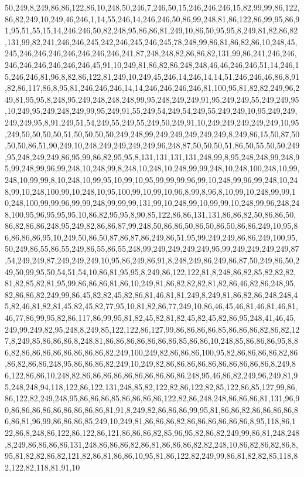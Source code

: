 50,249,8,249,86,86,122,86,10,248,50,246,7,246,50,15,246,246,246,15,82,99,99,86,122,86,82,249,10,249,46,246,1,14,55,246,14,246,246,50,86,99,248,81,86,122,86,99,95,86,91,95,51,55,15,14,246,246,50,82,248,95,86,86,81,249,10,86,50,95,95,8,249,81,82,86,82,131,99,82,241,246,246,245,242,246,245,246,245,78,248,99,86,81,86,82,86,10,248,45,245,246,246,246,246,246,246,246,241,87,248,248,82,86,86,82,131,99,86,241,246,246,246,246,246,246,246,246,45,91,10,249,81,86,82,86,248,248,46,46,246,246,51,14,246,15,246,246,81,96,8,82,86,122,81,249,10,249,45,246,14,246,14,14,51,246,246,46,86,8,91,82,86,117,86,8,95,81,246,246,246,14,14,246,246,246,246,81,100,95,81,82,82,249,96,249,81,95,95,8,248,95,249,248,248,248,99,95,248,249,249,91,95,249,249,55,249,249,95,10,249,95,249,248,249,99,95,249,91,55,249,54,249,54,249,55,249,249,10,95,249,249,249,249,95,8,91,249,51,54,249,55,249,55,249,50,249,91,10,249,249,249,249,249,10,95,249,50,50,50,50,51,50,50,50,50,249,248,99,249,249,249,249,249,8,249,86,15,50,87,50,50,50,86,51,90,249,10,248,249,249,249,249,96,248,87,50,50,50,51,86,50,55,50,50,249,95,248,249,249,86,95,99,86,82,95,95,8,131,131,131,131,248,99,8,95,248,248,99,248,95,99,248,99,96,99,248,10,248,99,8,248,10,248,10,248,99,99,248,10,248,100,248,10,99,248,10,99,99,8,10,248,10,99,95,10,99,10,95,99,99,99,96,99,10,248,99,96,99,248,10,248,99,10,248,100,99,10,248,10,95,100,99,10,99,10,96,8,99,8,96,8,10,99,10,248,99,99,10,248,100,99,99,96,99,99,248,99,99,99,131,99,10,248,99,10,99,99,10,248,99,96,248,248,100,95,96,95,95,95,10,86,82,95,95,8,90,85,122,86,86,131,131,86,86,82,50,86,86,50,86,82,86,86,248,95,249,82,86,86,87,99,248,50,86,86,50,86,50,86,50,86,86,249,10,95,86,86,86,86,95,10,249,50,86,50,87,86,87,86,249,86,51,95,99,249,249,86,86,249,100,95,50,249,86,55,86,55,249,86,55,86,55,248,99,249,249,249,249,95,99,249,249,249,249,87,54,249,249,87,249,249,249,10,95,86,249,86,91,8,248,249,86,249,86,87,50,249,86,50,249,50,99,95,50,54,51,54,10,86,81,95,95,8,249,86,122,122,81,8,248,86,82,85,82,82,82,81,82,85,82,81,95,99,86,86,86,81,86,10,249,81,86,82,82,82,81,82,86,46,82,86,248,95,82,86,86,82,249,99,86,45,82,82,45,82,86,81,46,81,81,249,8,249,81,86,82,86,248,248,45,82,46,81,82,81,45,82,45,82,77,95,10,81,82,86,77,249,10,86,46,45,46,81,46,81,46,81,46,77,86,99,95,82,86,117,86,99,95,81,82,45,82,81,82,45,82,45,82,86,95,248,41,46,45,249,99,249,82,95,248,8,249,85,122,122,86,127,99,86,86,86,86,85,86,86,86,82,86,82,127,8,249,85,86,86,86,8,248,81,86,86,86,86,86,86,86,85,86,86,10,248,85,86,86,86,95,8,86,82,86,86,86,86,86,86,86,86,82,249,100,249,82,86,86,86,100,95,82,86,86,86,86,82,86,86,82,86,86,248,95,86,86,86,82,249,10,249,82,86,86,86,86,86,86,86,86,86,86,8,249,86,122,86,86,10,248,82,86,86,86,86,86,86,86,86,86,86,248,95,46,86,82,249,96,249,81,95,248,248,94,118,122,86,122,131,248,85,82,122,82,86,122,82,85,122,86,85,127,99,86,86,122,82,249,248,95,86,86,86,85,86,86,86,86,122,82,86,248,248,86,86,86,81,131,96,90,86,86,86,86,86,86,86,86,86,81,91,8,249,82,86,86,86,99,95,81,86,86,82,86,86,86,86,86,86,81,96,99,86,86,86,85,249,10,249,81,86,86,86,82,86,86,86,86,86,86,8,95,118,86,122,86,8,248,86,122,86,122,86,121,86,86,86,82,85,96,95,82,86,82,249,99,86,81,248,248,8,249,86,86,86,86,131,248,86,86,86,82,86,81,86,86,86,82,82,248,10,86,82,86,82,86,8,95,81,82,82,86,82,121,82,86,81,86,86,10,95,81,86,122,82,249,99,86,81,82,82,85,118,82,122,82,118,81,91,10